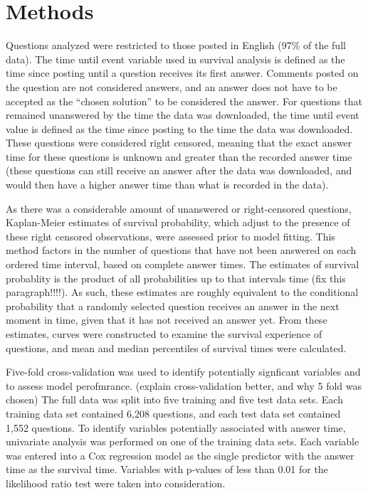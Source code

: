 \documentclass[12pt]{article}
\begin{document}
\section{Methods}

    Questions analyzed were restricted to those posted in English (97\% of the full data). The time until event variable used in survival analysis is defined as the time since posting until a question receives its first answer. Comments posted on the question are not considered answers, and an answer does not have to be accepted as the ``chosen solution'' to be considered the answer. For questions that remained unanswered by the time the data was downloaded, the time until event value is defined as the time since posting to the time the data was downloaded. These questions were considered right censored, meaning that the exact answer time for these questions is unknown and greater than the recorded answer time (these questions can still receive an answer after the data was downloaded, and would then have a higher answer time than what is recorded in the data). 

As there was a considerable amount of unanswered or right-censored questions, Kaplan-Meier estimates of survival probability, which adjust to the presence of these right censored observations, were assessed prior to model fitting. This method factors in the number of questions that have not been answered on each ordered time interval, based on complete answer times. The estimates of survival probablity is the product of all probabilities up to that intervals time (fix this paragraph!!!!). As such, these estimates are roughly equivalent to the conditional probability that a randomly selected question receives an answer in the next moment in time, given that it has not received an answer yet. From these estimates, curves were constructed to examine the survival experience of questions, and mean and median percentiles of survival times were calculated. 

Five-fold cross-validation was used to identify potentially signficant variables and to assess model perofmrance. (explain cross-validation better, and why 5 fold was chosen) The full data was split into five training and five test data sets. Each training data set contained 6,208 questions, and each test data set contained 1,552 questions. To identify variables potentially associated with answer time, univariate analysis was performed on one of the training data sets. Each variable was entered into a Cox regression model as the single predictor with the answer time as the survival time. Variables with p-values of less than 0.01 for the likelihood ratio test were taken into consideration. 
\end{document}
